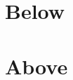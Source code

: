 \documentclass[10pt,a4paper]{article}
\begin{document}
\section{Below}\lipsum[1-6]
\section{Above}\lipsum[7-14]
\end{document}
